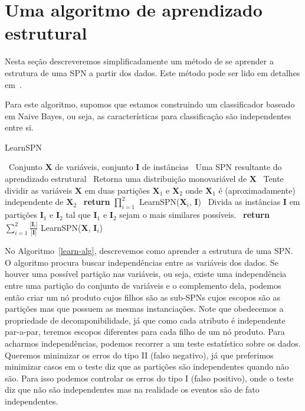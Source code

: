 \documentclass{amsart}
\theoremstyle{plain}
\numberwithin{equation}{section}
\newcommand{\set}[1]{\mathbf{#1}}
\begin{document}
\section{Uma algoritmo de aprendizado estrutural}

Nesta seção descreveremos simplificadamente um método de se aprender a estrutura de uma SPN a
partir dos dados. Este método pode ser lido em detalhes em~\cite{gens-domingos}.

Para este algoritmo, supomos que estamos construindo um classificador baseado em Naive Bayes, ou
seja, as características para classificação são independentes entre si.

\begin{algorithm}
  \caption{LearnSPN}\label{learn-alg}
  \begin{algorithmic}[1]
    \Require~Conjunto $\set{X}$ de variáveis, conjunto $\set{I}$ de instâncias
    \Ensure~Uma SPN resultante do aprendizado estrutural
    \If{$|\set{X}|=1$}
      \State~Retorna uma distribuição monovariável de $\set{X}$
    \EndIf
    \State~Tente dividir as variáveis $\set{X}$ em duas partições $\set{X}_1$ e $\set{X}_2$ onde
      $\set{X}_1$ é (aproximadamente) independente de $\set{X}_2$
      \State~\textbf{return} $\prod_{i=1}^2$ LearnSPN($\set{X}_i$, $\set{I}$)
    \Else
      \State~Divida as instâncias $\set{I}$ em partições $\set{I}_1$ e $\set{I}_2$ tal que
        $\set{I}_1$ e $\set{I}_2$ sejam o mais similares possíveis.
      \State~\textbf{return} $\sum_{i=1}^2 \frac{|\set{I}_i|}{|\set{I}|}$ LearnSPN($\set{X}$,
        $\set{I}_i$)
    \EndIf
  \end{algorithmic}
\end{algorithm}

No Algoritmo~\ref{learn-alg}, descrevemos como aprender a estrutura de uma SPN\@. O algoritmo
procura buscar independências entre as variáveis dos dados. Se houver uma possível partição nas
variáveis, ou seja, existe uma independência entre uma partição do conjunto de variáveis e o
complemento dela, podemos então criar um nó produto cujos filhos são as sub-SPNs cujos escopos são
as partições mas que possuem as mesmas instanciações. Note que obedecemos a propriedade de
decomponibilidade, já que como cada atributo é independente par-a-par, teremos escopos diferentes
para cada filho de um nó produto. Para acharmos independências, podemos recorrer a um teste
estatístico sobre os dados. Queremos minimizar os erros do tipo II (falso negativo), já que
preferimos minimizar casos em o teste diz que as partições são independentes quando não são.
Para isso podemos controlar os erros do tipo I (falso positivo), onde o teste diz que não são
independentes mas na realidade os eventos são de fato independentes.
\end{document}
